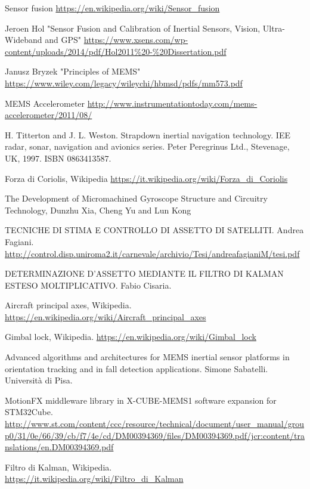 \begin{thebibliography}{99}
Sensor fusion
\url{https://en.wikipedia.org/wiki/Sensor_fusion}

Jeroen Hol "Sensor Fusion and Calibration of
Inertial Sensors, Vision,
Ultra-Wideband and GPS"
\url{https://www.xsens.com/wp-content/uploads/2014/pdf/Hol2011%20-%20Dissertation.pdf}

Janusz Bryzek "Principles of MEMS"
\url{https://www.wiley.com/legacy/wileychi/hbmsd/pdfs/mm573.pdf}


MEMS Accelerometer
\url{http://www.instrumentationtoday.com/mems-accelerometer/2011/08/}


H. Titterton and J. L. Weston. Strapdown inertial navigation technology. IEE
radar, sonar, navigation and avionics series. Peter Peregrinus Ltd., Stevenage,
UK, 1997. ISBN 0863413587.

Forza di Coriolis, Wikipedia
\url{https://it.wikipedia.org/wiki/Forza_di_Coriolis}

The Development of Micromachined Gyroscope Structure and
Circuitry Technology, Dunzhu Xia, Cheng Yu and Lun Kong

TECNICHE DI STIMA E CONTROLLO DI ASSETTO DI
SATELLITI. Andrea Fagiani. 
\url{http://control.disp.uniroma2.it/carnevale/archivio/Tesi/andreafagianiM/tesi.pdf}

DETERMINAZIONE D'ASSETTO MEDIANTE
IL FILTRO DI KALMAN ESTESO
MOLTIPLICATIVO. Fabio Cisaria. 

Aircraft principal axes, Wikipedia.
\url{https://en.wikipedia.org/wiki/Aircraft_principal_axes}

Gimbal lock, Wikipedia.
\url{https://en.wikipedia.org/wiki/Gimbal_lock}

Advanced algorithms and architectures for MEMS inertial sensor platforms 
in orientation tracking and in fall detection applications. Simone Sabatelli.
Università di Pisa.

MotionFX middleware library in X-CUBE-MEMS1 software
expansion for STM32Cube.\\
\url{http://www.st.com/content/ccc/resource/technical/document/user_manual/group0/31/0e/66/39/cb/f7/4e/cd/DM00394369/files/DM00394369.pdf/jcr:content/translations/en.DM00394369.pdf}

Filtro di Kalman, Wikipedia.\\
\url{https://it.wikipedia.org/wiki/Filtro_di_Kalman}


\end{thebibliography}
